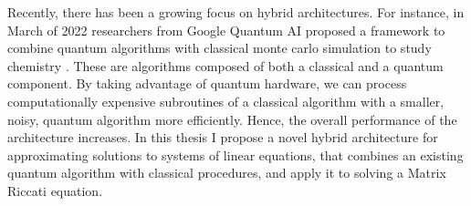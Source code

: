 Recently, there has been a growing focus on hybrid architectures. For instance, in March of 2022 researchers from Google Quantum AI proposed a framework to combine quantum algorithms with classical monte carlo simulation to study chemistry \cite{huggins_hybrid_2022}. These are algorithms composed of both a classical and a quantum component. By taking advantage of quantum hardware, we can process computationally expensive subroutines of a classical algorithm with a smaller, noisy, quantum algorithm more efficiently. Hence, the overall performance of the architecture increases. In this thesis I propose a novel hybrid architecture for approximating solutions to systems of linear equations, that combines an existing quantum algorithm with classical procedures, and apply it to solving a Matrix Riccati equation.